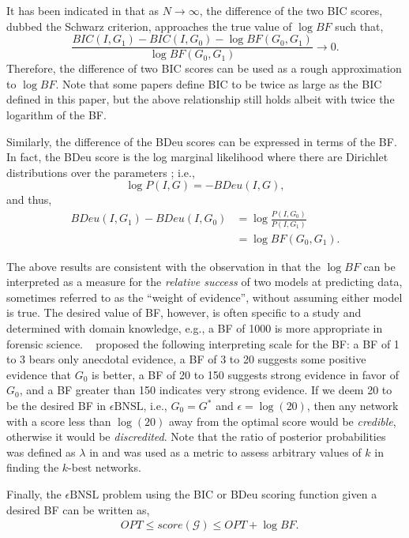 \documentclass[letterpaper]{article}
\newcommand{\opt}{\mathit{OPT}}
\newcommand{\graph}{\mathit{G}}
\newcommand{\graphset}{\mathcal{G}}
\newcommand{\cost}{\mathit{score}}
\newcommand{\problem}{\mathit{\epsilon}\text{BNSL}}
\newcommand{\varI}{I}
\begin{document}
It has been indicated in \cite{kass1995bayes} that as $N\rightarrow\infty$, the difference of the two BIC scores,
dubbed the Schwarz criterion,  approaches the true value of $\log{BF}$ such that,
$$
\frac{BIC(\varI,\graph_1)-BIC(\varI,\graph_0)-\log{BF(\graph_0,\graph_1)}}{\log{BF(\graph_0,\graph_1)}}\rightarrow 0.
$$
Therefore, the difference of two BIC scores can be used as a rough approximation to $\log{BF}$. Note that some papers define BIC to be twice as large as the BIC defined in this paper, but the above relationship still holds albeit with twice the logarithm of the BF.

Similarly, the difference of the BDeu scores can be expressed in terms of the BF. In fact, the BDeu score is the log marginal likelihood where there are Dirichlet distributions over the parameters \cite{Buntine91,HeckermanGC95}; i.e.,
$$
\log{P(\varI,\graph)}=-BDeu(\varI,\graph),
$$
and thus,
\begin{align*}
    BDeu(\varI,\graph_1)-BDeu(\varI,\graph_0)&=\log{\frac{P(\varI,\graph_0)}{P(\varI,\graph_1)}}\\
    &=\log{BF(\graph_0,\graph_1)}.
\end{align*}

The above results are consistent with the observation in \cite{kass1995bayes} that the $\log{BF}$ can be interpreted as a measure for the \emph{relative success} of two models at predicting data, sometimes referred to as the ``weight of evidence'', without assuming either model is true. The desired value of BF, however, is often specific to a study and determined with domain knowledge, e.g., a BF of 1000 is more appropriate in forensic science. \citeauthor{HeckermanGC95}~ proposed the following interpreting scale for the BF: a BF of 1 to 3 bears only anecdotal evidence, a BF of 3 to 20 suggests some positive evidence that $\graph_0$ is better, a BF of 20 to 150 suggests strong evidence in favor of $\graph_0$, and a BF greater than 150 indicates very strong evidence. If we deem 20 to be the desired BF in $\problem$, i.e., $\graph_0=\graph^*$ and $\epsilon=\log(20)$, then any network with a score less than $\log(20)$ away from the optimal score would be \emph{credible}, otherwise it would be \emph{discredited}. Note that the ratio of posterior probabilities was defined as $\lambda$ in \cite{TianHR10,ChenT2014} and was used as a metric to assess arbitrary values of $k$ in finding the $k$-best networks.

Finally, the $\problem$ problem using the BIC or BDeu scoring function given a desired BF can be written as,
\begin{align}\label{EQUATION:bf}
    &\opt \le \cost(\graphset) \le \opt+\log{BF}.
\end{align}
\end{document}
